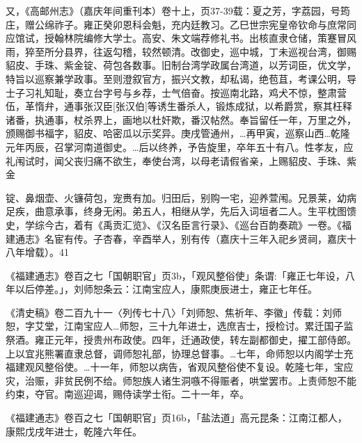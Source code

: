 又，《高邮州志》（嘉庆年间重刊本）卷十上，页37-39载：夏之芳，字荔园，号筠庄，赠公绵祚子。雍正癸卯恩科会魁，充内廷教习。乙巳世宗宪皇帝钦命与庶常同应馆试，授翰林院编修大学士。高安、朱文端荐修礼书。出核直隶仓储，策蹇冒风雨，猝至所分县界，往返勾稽，较然顿清。改御史，巡中城，丁未巡视台湾，御赐貂皮、手珠、紫金锭、荷包各数事。旧制台湾学政属台湾道，以芳词臣，优文学，特旨以巡察兼学政事。至则澄叙官方，振兴文教，却私谒，绝苞苴，考课公明，导士子习礼知耻，奏立台字号与乡荐，士气倍奋。按巡南北路，鸡犬不惊，整肃营伍，革惰弁，通事张汉臣[张汉伯]等诱生番杀人，锻炼成狱，以希爵赏，察其枉释诸番，执通事，杖杀界上，画地以杜奸欺，番汉帖然。奉旨留任一年，万里之外，颁赐御书福字，貂皮、哈密瓜以示奖异。庚戌管通州，…再甲寅，巡察山西…乾隆元年丙辰，召掌河南道御史。…后以终养，予告旋里，卒年五十有八。性孝友，应礼闱试时，闻父丧归痛不欲生，奉使台湾，以母老请假省亲，上赐貂皮、手珠、紫金

\vfill
\begin{BookNotes}
\end{BookNotes}

\noindent 锭、鼻烟壶、火镰荷包，宠赉有加。归田后，别购一宅，迎养萱闱。兄景莱，幼病足疾，曲意承事，终身无闲。弟五人，相继从学，先后入词垣者二人。生平枕图馈史，学综今古，着有《禹贡汇览》、《汉名臣言行录》、《巡台百韵奏疏》一卷。《福建通志》名宦有传。子杏春，辛酉举人，别有传（嘉庆十三年入祀乡贤祠，嘉庆十八年增载）。41


\noindent 《福建通志》卷百之七「国朝职官」页3b，「观风整俗使」条谓:「雍正七年设，八年以后停差。」，刘师恕条云：江南宝应人，康熙庚辰进士，雍正七年任。

《清史稿》卷二百九十一〈列传七十八〉「刘师恕、焦祈年、李徽」传载：刘师恕，字艾堂，江南宝应人…师恕，三十九年进士，选庶吉士，授检讨。累迁国子监祭酒。雍正元年，授贵州布政使。四年，迁通政使，转左副都御史，擢工部侍郎。上以宜兆熊署直隶总督，调师恕礼部，协理总督事。…七年，命师恕以内阁学士充福建观风整俗使。…十一年，师恕以病告，省观风整俗使不复设。乾隆七年，宝应灾，治赈，非贫民例不给。师恕族人诸生洞嗾不得赈者，哄堂罢市。上责师恕不能约束，夺官。南巡迎谒，赐侍读学士衔。二十一年，卒。


\noindent 《福建通志》卷百之七「国朝职官」页16b，「盐法道」高元昆条：江南江都人，康熙戊戌年进士，乾隆六年任。


